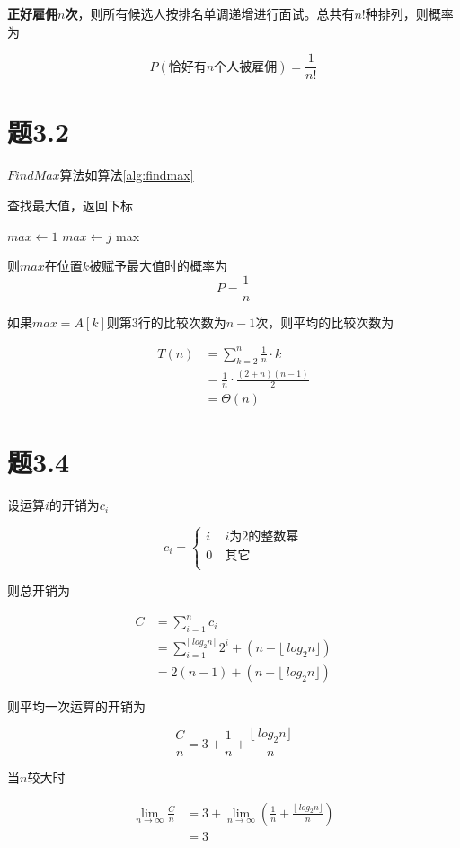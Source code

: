 \documentclass[a4paper,twoside]{article}
\begin{document}
\begin{spacing}{1.2}
\textbf{正好雇佣$n$次}，则所有候选人按排名单调递增进行面试。总共有$n!$种排列，则概率为

$$
P(\mbox{恰好有$n$个人被雇佣})=\frac{1}{n!}
$$

\section{题3.2}

$FindMax$算法如算法\ref{alg:findmax}

\begin{algorithm}
	\caption{查找最大值，返回下标}
	\label{alg:findmax}
	\begin{algorithmic}[1]
		\State $max \gets 1$
		\State $max \gets j$
		\EndIf
		\EndFor
		\Return max
		\EndProcedure
		
	\end{algorithmic}
\end{algorithm}

则$max$在位置$k$被赋予最大值时的概率为
$$
P=\frac{1}{n}
$$

如果$max=A[k]$则第$3$行的比较次数为$n-1$次，则平均的比较次数为

\begin{align*}
	T(n) &= \sum_{k=2}^{n}\frac{1}{n} \cdot k \\
	&= \frac{1}{n} \cdot \frac{(2+n)(n-1)}{2} \\
	&= \Theta(n)
\end{align*}

\section{题3.4}

设运算$i$的开销为$c_i$

$$ c_i=\left\{
\begin{aligned}
	i & \  \mbox{$i$为$2$的整数幂} \\
	0 & \  \mbox{其它} \\
\end{aligned}
\right.
$$

则总开销为

\begin{align*}
	C &= \sum_{i=1}^{n}c_i \\
	&= \sum_{i=1}^{\lfloor\ log_2 n \rfloor}2^i+(n-\lfloor\ log_2 n \rfloor) \\
	&=  2(n-1) + (n-\lfloor\ log_2 n \rfloor)
\end{align*}

则平均一次运算的开销为

$$
\frac{C}{n} = 3+\frac{1}{n}+\frac{\lfloor\ log_2 n \rfloor}{n} 
$$

当$n$较大时

\begin{align*}
	\lim_{n \to \infty}\frac{C}{n} &= 3+\lim_{n \to \infty}(\frac{1}{n}+\frac{\lfloor\ log_2 n \rfloor}{n}) \\
	&=3
\end{align*}

\end{spacing}
\end{document}
